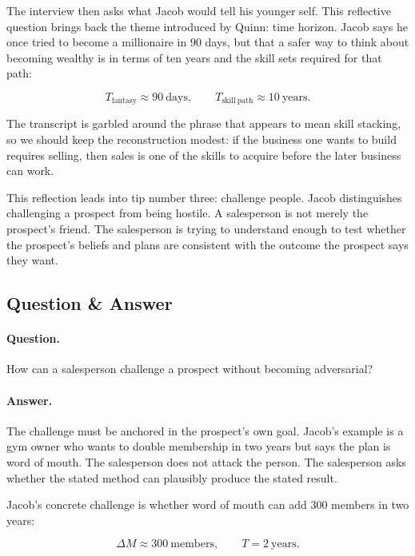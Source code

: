 The interview then asks what Jacob would tell his younger self. This reflective question brings back the theme introduced by Quinn: time horizon. Jacob says he once tried to become a millionaire in \(90\) days, but that a safer way to think about becoming wealthy is in terms of ten years and the skill sets required for that path:

\begin{equation}
T_{\mathrm{fantasy}} \approx 90\ \mathrm{days},
\qquad
T_{\mathrm{skill\ path}} \approx 10\ \mathrm{years}.
\end{equation}

The transcript is garbled around the phrase that appears to mean skill stacking, so we should keep the reconstruction modest: if the business one wants to build requires selling, then sales is one of the skills to acquire before the later business can work.

This reflection leads into tip number three: challenge people. Jacob distinguishes challenging a prospect from being hostile. A salesperson is not merely the prospect's friend. The salesperson is trying to understand enough to test whether the prospect's beliefs and plans are consistent with the outcome the prospect says they want.

\subsection{Question \& Answer}

\paragraph{Question.}
How can a salesperson challenge a prospect without becoming adversarial?

\paragraph{Answer.}
The challenge must be anchored in the prospect's own goal. Jacob's example is a gym owner who wants to double membership in two years but says the plan is word of mouth. The salesperson does not attack the person. The salesperson asks whether the stated method can plausibly produce the stated result.

Jacob's concrete challenge is whether word of mouth can add \(300\) members in two years:

\begin{equation}
\Delta M \approx 300\ \mathrm{members},
\qquad
T = 2\ \mathrm{years}.
\end{equation}

